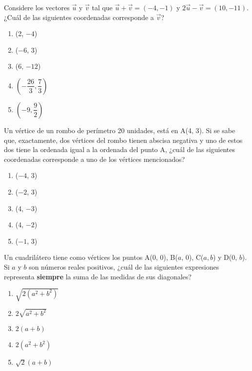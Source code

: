 \begin{enumerate}[label=\large{\textbf{\arabic*.}}, itemsep = 0.15cm, topsep = 0.5cm]
	\parbox{1\linewidth}{ \item Considere los vectores $\vec{u}$ y $\vec{v}$ tal que $\vec{u}+\vec{v}=(-4,-1)$ y $2\vec{u}-\vec{v}=(10,-11)$. ¿Cuál de las siguientes coordenadas corresponde a $\vec{v}$? 
		\begin{enumerate}[label={\Alph*)}, itemsep = 0.15cm, topsep = 0.5cm]
			\item (2, $-4$)
			\item  ($-6$, 3)
			\item (6, $-12$)
			\item $\left(-\dfrac{26}{3}, \dfrac{7}{3}\right)$
			\item $\left(-9, \dfrac{9}{2}\right)$
	\end{enumerate}}
	
	\parbox{1\linewidth}{ \item Un vértice de un rombo de perímetro 20 unidades, está en A(4, 3). Si se sabe que, exactamente, dos vértices del rombo tienen abscisa negativa y uno de estos dos tiene la ordenada igual a la ordenada del punto A, ¿cuál de las siguientes coordenadas corres\-ponde a uno de los vértices mencionados? 
		
		\begin{enumerate}[label={\Alph*)}, itemsep = 0.15cm, topsep = 0.5cm]
			\item ($-4$, 3)
			\item ($-2$, 3)
			\item (4, $-3$)
			\item (4, $-2$)
			\item ($-1$, 3)
	\end{enumerate}}
	
	
	\parbox{1\linewidth}{ \item Un cuadrilátero tiene como vértices los puntos A(0, 0), B($a$, 0), C($a, b$) y D(0, $b$). Si $a$ y $b$ son números reales positivos, ¿cuál de las siguientes expresiones representa \textbf{siempre} la suma de las medidas de sus diagonales? 
		\begin{enumerate}[label={\Alph*)}, itemsep = 0.15cm, topsep = 0.5cm]
			\item $\sqrt{2(a^2+b^2)}$
			\item $2\sqrt{a^2+b^2}$
			\item $2(a+b)$
			\item $2(a^2+b^2)$
			\item $\sqrt{2}(a+b)$
	\end{enumerate}}
	

\end{enumerate}
